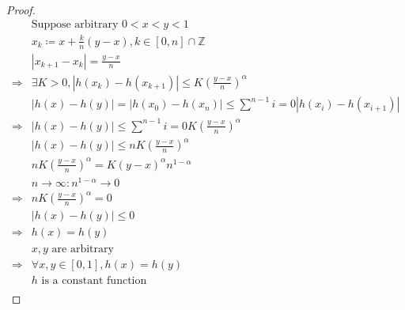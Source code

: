 \documentclass{article}
\begin{document}
~

\begin{proof}
    \begin{align*}
        &\text{Suppose arbitrary }0<x<y<1\\
        &x_k\coloneqq x+\frac{k}{n}(y-x),k\in[0,n]\cap\mathbb{Z}\\
        &|x_{k+1}-x_k|=\frac{y-x}{n}\\
        \Rightarrow&\exists K>0,|h(x_k)-h(x_{k+1})|\leqslant K(\frac{y-x}{n})^\alpha\\
        &|h(x)-h(y)|=|h(x_0)-h(x_n)|\leqslant\sum^{n-1}{i=0}|h(x_i)-h(x_{i+1})|\\
        \Rightarrow&|h(x)-h(y)|\leqslant \sum^{n-1}{i=0}K(\frac{y-x}{n})^\alpha\\
        &|h(x)-h(y)|\leqslant nK(\frac{y-x}{n})^\alpha\\
        &nK(\frac{y-x}{n})^\alpha=K(y-x)^\alpha n^{1-\alpha}\\
        &n\to\infty:n^{1-\alpha}\to0\\
        \Rightarrow&nK(\frac{y-x}{n})^\alpha=0\\
        &|h(x)-h(y)|\leqslant0\\
        \Rightarrow&h(x)=h(y)\\
        &x,y\text{ are arbitrary}\\
        \Rightarrow&\forall x,y\in [0,1],h(x)=h(y)\\
        &h\text{ is a constant function}\\
    \end{align*}
\end{proof}
\end{document}
